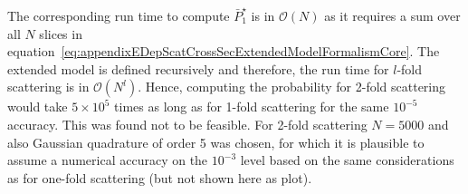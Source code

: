 The corresponding run time to compute $\bar{P}^{\star}_1$ is in $\mathcal{O}(N)$ as it requires a sum over all $N$ slices in equation~\ref{eq:appendixEDepScatCrossSecExtendedModelFormalismCore}. The extended model is defined recursively and therefore, the run time for $l$-fold scattering is in $\mathcal{O}(N^l)$. Hence, computing the probability for 2-fold scattering would take $5\times10^5$ times as long as for 1-fold scattering for the same $10^{-5}$ accuracy. This was found not to be feasible. For 2-fold scattering $N=5000$ and also Gaussian quadrature of order 5 was chosen, for which it is plausible to assume a numerical accuracy on the $10^{-3}$ level based on the same considerations as for one-fold scattering (but not shown here as plot).
\FloatBarrier